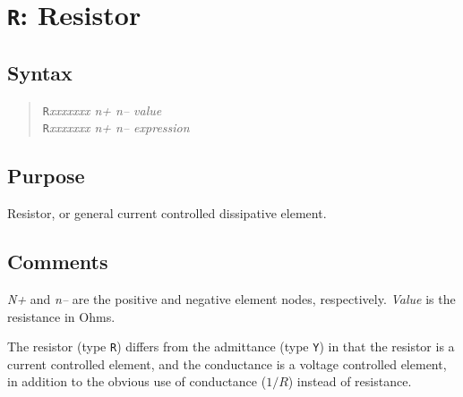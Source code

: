 \section{{\tt R}: Resistor}
\subsection{Syntax}
\begin{verse}
{\tt R}{\it xxxxxxx n+ n-- value}\\
{\tt R}{\it xxxxxxx n+ n-- expression}
\end{verse}
\subsection{Purpose}

Resistor, or general current controlled dissipative element.
\subsection{Comments}

{\it N+} and {\it n--} are the positive and negative element nodes,
respectively.  {\it Value} is the resistance in Ohms.

The resistor (type {\tt R}) differs from the admittance (type {\tt Y}) in
that the resistor is a current controlled element, and the conductance is a
voltage controlled element, in addition to the obvious use of conductance
($1/R$) instead of resistance.

